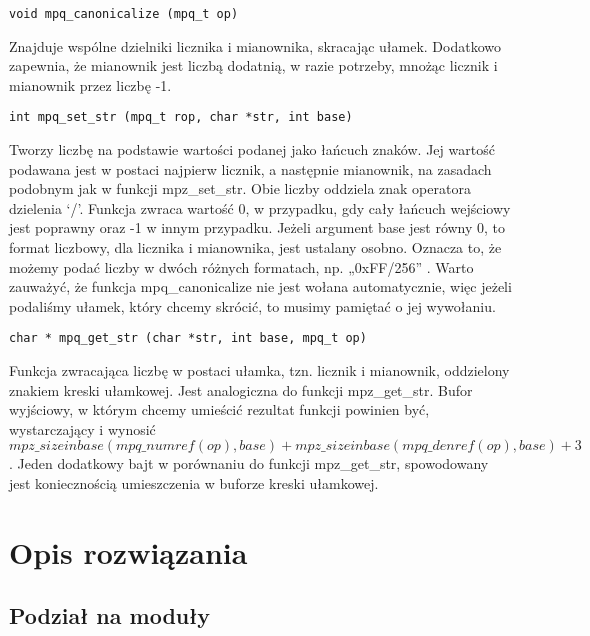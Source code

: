 \documentclass[twoside,a4paper]{book}
\begin{document}
\begin{lstlisting}
void mpq_canonicalize (mpq_t op)
\end{lstlisting}

Znajduje wspólne dzielniki licznika i mianownika, skracając ułamek. Dodatkowo zapewnia, że mianownik jest liczbą dodatnią, w razie potrzeby, mnożąc licznik i mianownik przez liczbę -1.

\begin{lstlisting}
int mpq_set_str (mpq_t rop, char *str, int base)
\end{lstlisting}

Tworzy liczbę na podstawie wartości podanej jako łańcuch znaków. Jej wartość podawana jest w postaci najpierw licznik, a następnie mianownik, na zasadach podobnym jak w funkcji mpz\_set\_str. Obie liczby oddziela znak operatora dzielenia ‘/’. Funkcja zwraca wartość 0, w przypadku, gdy cały łańcuch wejściowy jest poprawny oraz -1 w innym przypadku. Jeżeli argument base jest równy 0, to format liczbowy, dla licznika i mianownika, jest ustalany osobno. Oznacza to, że możemy podać liczby w dwóch różnych formatach, np. „0xFF/256” . Warto zauważyć, że funkcja mpq\_canonicalize nie jest wołana automatycznie, więc jeżeli podaliśmy ułamek, który chcemy skrócić, to musimy pamiętać o jej wywołaniu.

\begin{lstlisting}
char * mpq_get_str (char *str, int base, mpq_t op)
\end{lstlisting}

Funkcja zwracająca liczbę w postaci ułamka, tzn. licznik i mianownik, oddzielony znakiem kreski ułamkowej. Jest analogiczna do funkcji mpz\_get\_str. Bufor wyjściowy, w którym chcemy umieścić rezultat funkcji powinien być, wystarczający i wynosić $mpz\_sizeinbase(mpq\_numref(op), base) + mpz\_sizeinbase (mpq\_denref(op), base) + 3$. Jeden dodatkowy bajt w porównaniu do funkcji mpz\_get\_str, spowodowany jest koniecznością umieszczenia w buforze kreski ułamkowej.











\chapter{Opis rozwiązania}
\section{Podział na moduły}
\end{document}
